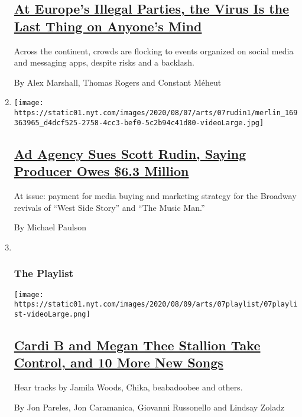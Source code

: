 \begin{enumerate}
{  \subsection{\texorpdfstring{\href{/2020/08/07/arts/music/illegal-parties-coronavirus-europe.html}{At
  Europe's Illegal Parties, the Virus Is the Last Thing on Anyone's
  Mind}}{At Europe's Illegal Parties, the Virus Is the Last Thing on Anyone's Mind}}\label{at-europes-illegal-parties-the-virus-is-the-last-thing-on-anyones-mind}}

  Across the continent, crowds are flocking to events organized on
  social media and messaging apps, despite risks and a backlash.

  By Alex Marshall, Thomas Rogers and Constant Méheut
\item
  \texttt{[image: https://static01.nyt.com/images/2020/08/07/arts/07rudin1/merlin\_169363965\_d4dcf525-2758-4cc3-bef0-5c2b94c41d80-videoLarge.jpg]}

  \hypertarget{ad-agency-sues-scott-rudin-saying-producer-owes-63-million}{%
  \subsection{\texorpdfstring{\href{/2020/08/07/theater/scott-rudin-spotco-broadway-lawsuit.html}{Ad
  Agency Sues Scott Rudin, Saying Producer Owes \$6.3
  Million}}{Ad Agency Sues Scott Rudin, Saying Producer Owes \$6.3 Million}}\label{ad-agency-sues-scott-rudin-saying-producer-owes-63-million}}

  At issue: payment for media buying and marketing strategy for the
  Broadway revivals of ``West Side Story'' and ``The Music Man.''

  By Michael Paulson
\item ~
  \hypertarget{the-playlist}{%
  \subsubsection{The Playlist}\label{the-playlist}}

  \texttt{[image: https://static01.nyt.com/images/2020/08/09/arts/07playlist/07playlist-videoLarge.png]}

  \hypertarget{cardi-b-and-megan-thee-stallion-take-control-and-10-more-new-songs}{%
  \subsection{\texorpdfstring{\href{/2020/08/07/arts/music/playlist-cardi-b-megan-thee-stallion.html}{Cardi
  B and Megan Thee Stallion Take Control, and 10 More New
  Songs}}{Cardi B and Megan Thee Stallion Take Control, and 10 More New Songs}}\label{cardi-b-and-megan-thee-stallion-take-control-and-10-more-new-songs}}

  Hear tracks by Jamila Woods, Chika, beabadoobee and others.

  By Jon Pareles, Jon Caramanica, Giovanni Russonello and Lindsay Zoladz
\end{enumerate}

